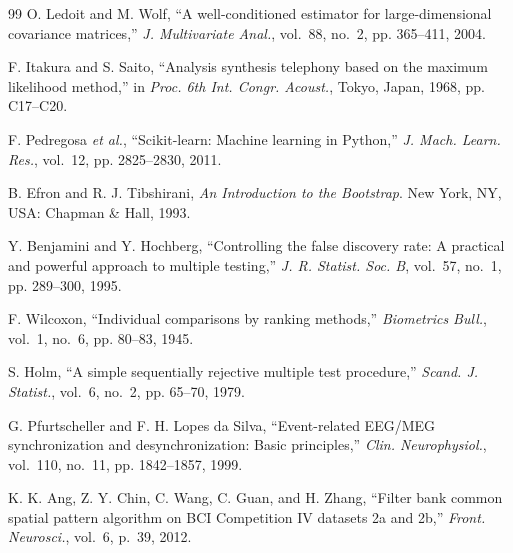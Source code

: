 \begin{thebibliography}{99}
O. Ledoit and M. Wolf, ``A well-conditioned estimator for large-dimensional covariance matrices,'' \emph{J. Multivariate Anal.}, vol.~88, no.~2, pp. 365--411, 2004.

F. Itakura and S. Saito, ``Analysis synthesis telephony based on the maximum likelihood method,'' in \emph{Proc. 6th Int. Congr. Acoust.}, Tokyo, Japan, 1968, pp. C17--C20.

F. Pedregosa \emph{et al.}, ``Scikit-learn: Machine learning in Python,'' \emph{J. Mach. Learn. Res.}, vol.~12, pp. 2825--2830, 2011.

B. Efron and R. J. Tibshirani, \emph{An Introduction to the Bootstrap}. New York, NY, USA: Chapman \& Hall, 1993.

Y. Benjamini and Y. Hochberg, ``Controlling the false discovery rate: A practical and powerful approach to multiple testing,'' \emph{J. R. Statist. Soc. B}, vol.~57, no.~1, pp. 289--300, 1995.

F. Wilcoxon, ``Individual comparisons by ranking methods,'' \emph{Biometrics Bull.}, vol.~1, no.~6, pp. 80--83, 1945.

S. Holm, ``A simple sequentially rejective multiple test procedure,'' \emph{Scand. J. Statist.}, vol.~6, no.~2, pp. 65--70, 1979.

G. Pfurtscheller and F. H. Lopes da Silva, ``Event-related EEG/MEG synchronization and desynchronization: Basic principles,'' \emph{Clin. Neurophysiol.}, vol.~110, no.~11, pp. 1842--1857, 1999.

K. K. Ang, Z. Y. Chin, C. Wang, C. Guan, and H. Zhang, ``Filter bank common spatial pattern algorithm on BCI Competition IV datasets 2a and 2b,'' \emph{Front. Neurosci.}, vol.~6, p.~39, 2012.

\end{thebibliography}
